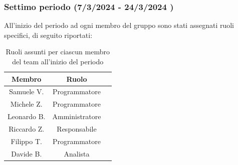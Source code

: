 \subsubsection{Settimo periodo (7/3/2024 - 24/3/2024 )}



All'inizio del periodo ad ogni membro del gruppo sono stati assegnati ruoli specifici, di seguito riportati:
\begin{table}[H]
\centering
\begin{tabular}{|c|c|c|}
\hline
\textbf{Membro} & \textbf{Ruolo} \\
\hline
Samuele V. & Programmatore \\
\hline
Michele Z. & Programmatore \\
\hline
Leonardo B. & Amministratore \\
\hline
Riccardo Z. & Responsabile \\
\hline
Filippo T. & Programmatore \\
\hline
Davide B. & Analista \\
\hline
\end{tabular}
\caption{Ruoli assunti per ciascun membro del team all'inizio del periodo}
\end{table}

